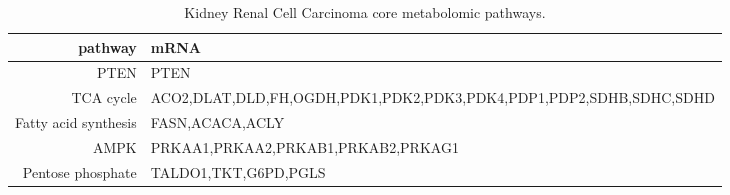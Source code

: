 \begin{table}[ht]
\centering
\begin{tabularx}{\textwidth}{r|l}
  \hline
pathway & mRNA \\ 
  \hline
PTEN & PTEN \\ 
  TCA cycle & ACO2,DLAT,DLD,FH,OGDH,PDK1,PDK2,PDK3,PDK4,PDP1,PDP2,SDHB,SDHC,SDHD \\ 
  Fatty acid synthesis & FASN,ACACA,ACLY \\ 
  AMPK & PRKAA1,PRKAA2,PRKAB1,PRKAB2,PRKAG1 \\ 
  Pentose phosphate & TALDO1,TKT,G6PD,PGLS \\ 
   \hline
\end{tabularx}
\caption{Kidney Renal Cell Carcinoma core metabolomic pathways.\label{tab:tcga_paths}} 
\end{table}
